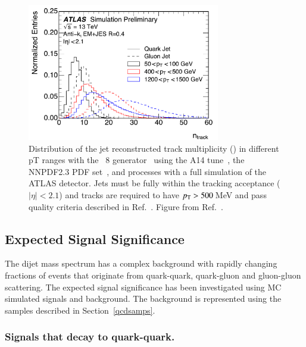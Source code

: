 \begin{figure}[htb]
 \centering
\includegraphics[width=0.75\textwidth]{figures/tagging/fig_01_ATL-PHYS-PUB-2017-009.pdf}
\caption{Distribution of the jet reconstructed track multiplicity (\ntrk ) in
 different pT ranges with the \Pythia~8 generator~\cite{pythia8} using
 the A14 tune~\cite{A14tune}, the NNPDF2.3 PDF
 set~\cite{Carrazza:2013axa}, and processes with a full simulation of the
 ATLAS detector. Jets must be fully within the tracking acceptance
 ($|\eta|<2.1$) and tracks are required to have $p_{\mathrm T} > 500$\,MeV and pass
  quality criteria described in Ref.~\cite{ATL-PHYS-PUB-2017-009}. Figure
 from Ref.~\cite{ATL-PHYS-PUB-2017-009}. \label{fig:jet_pt_quark_gluon}}
\end{figure}


\subsection{Expected Signal Significance}
\label{sec:ExpectedSig}

The dijet mass spectrum has a complex background with rapidly changing  fractions of events that originate 
from quark-quark, quark-gluon and gluon-gluon scattering. The expected signal significance has been investigated using 
MC simulated  signals and background. The background is represented using the \QCD samples described 
in Section~\ref{qcdsamps}. 

\subsubsection{Signals that decay to quark-quark.}

